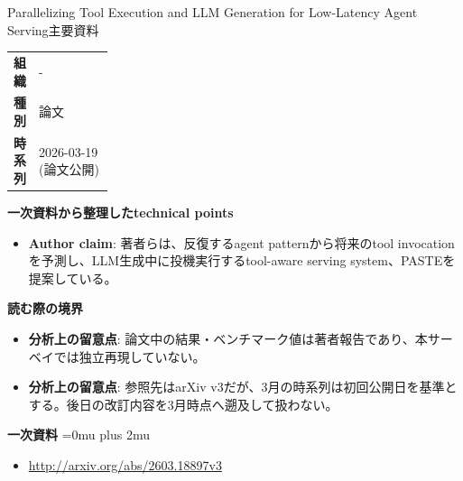 \begin{technicalnote}{Parallelizing Tool Execution and LLM Generation for Low-Latency Agent Serving}{主要資料}
\begingroup
\begin{tabularx}{\linewidth}{@{}>{\bfseries}p{0.22\linewidth}X@{}}
組織 & - \\
種別 & 論文 \\
時系列 & 2026-03-19 (論文公開) \\
\end{tabularx}
\smallskip
{\bfseries 一次資料から整理したtechnical points}
\begin{itemize}[leftmargin=1.5em,itemsep=0.35em]
\item \textbf{Author claim}: 著者らは、反復するagent patternから将来のtool invocationを予測し、LLM生成中に投機実行するtool-aware serving system、PASTEを提案している。
\end{itemize}
\begin{minipage}{\linewidth}
{\bfseries 読む際の境界}
\begin{itemize}[leftmargin=1.5em,itemsep=0.35em]
\item \textbf{分析上の留意点}: 論文中の結果・ベンチマーク値は著者報告であり、本サーベイでは独立再現していない。
\item \textbf{分析上の留意点}: 参照先はarXiv v3だが、3月の時系列は初回公開日を基準とする。後日の改訂内容を3月時点へ遡及して扱わない。
\end{itemize}
\begin{samepage}
{\bfseries 一次資料}
\begingroup\sloppy
\Urlmuskip=0mu plus 2mu\relax
\begin{itemize}[leftmargin=1.5em,itemsep=0.25em]
\item {\scriptsize\url{http://arxiv.org/abs/2603.18897v3}}
\end{itemize}
\endgroup
\end{samepage}
\end{minipage}
\endgroup
\end{technicalnote}
\medskip


